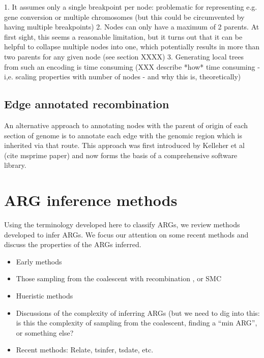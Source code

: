 \documentclass{article}
\begin{document}
1. It assumes only a single breakpoint per node: problematic for representing
e.g. gene conversion or multiple chromosomes (but this could be circumvented by
having multiple breakpoints)
2. Nodes can only have a maximum of 2 parents. At
first sight, this seems a reasonable limitation, but it turns out that it can
be helpful to collapse multiple nodes into one, which potentially results in
more than two parents for any given node (see section XXXX)
3. Generating local
trees from such an encoding is time consuming (XXX describe *how* time
consuming - i,e. scaling properties with number of nodes - and why this is,
theoretically)

\subsection*{Edge annotated recombination}

An alternative approach to annotating nodes with the parent of origin of each
section of genome is to annotate each edge with the genomic region which is
inherited via that route. This approach was first introduced by Kelleher et al
(cite msprime paper) and now forms the basis of a comprehensive software
library.


\section*{ARG inference methods}
Using the terminology developed here to classify ARGs, we review methods developed
to infer ARGs. We focus our attention on some recent methods and discuss the
properties of the ARGs inferred.

\begin{itemize}
\item Early methods \citep{hein1990reconstructing}
\item Those sampling from the coalescent with recombination
\citep{griffiths1996ancestral,kuhner2000maximum,fearnhead2001estimating},
or SMC
\citep{rasmussen2014genome}
\item Hueristic methods~\citep{song2005efficient,minichiello2006mapping,
parida2008estimating,fallon2013acg,mirzaei2016rent}
\item Discussions of the complexity of inferring ARGs (but we need to
dig into this: is this the complexity of sampling from the coalescent,
finding a ``min ARG'', or something else?
\citep{bordewich2005computational,wang2001perfect,hein1990reconstructing,song2005constructing}
\item Recent methods: Relate, tsinfer, tsdate, etc.
\end{itemize}



\end{document}
